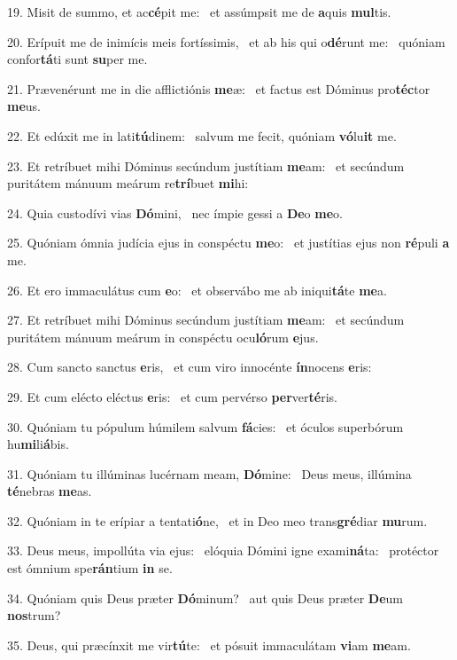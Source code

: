 19. Misit de summo, et ac\textbf{cé}pit me: \ast\  et assúmpsit me de \textbf{a}quis \textbf{mul}tis.\

20. Erípuit me de inimícis meis fortíssimis, \dag\  et ab his qui o\textbf{dé}runt me: \ast\  quóniam confor\textbf{tá}ti sunt \textbf{su}per me.\

21. Prævenérunt me in die afflictiónis \textbf{me}æ: \ast\  et factus est Dóminus pro\textbf{téc}tor \textbf{me}us.\

22. Et edúxit me in lati\textbf{tú}dinem: \ast\  salvum me fecit, quóniam \textbf{vó}lu\textbf{it} me.\

23. Et retríbuet mihi Dóminus secúndum justítiam \textbf{me}am: \ast\  et secúndum puritátem mánuum meárum re\textbf{trí}buet \textbf{mi}hi:\

24. Quia custodívi vias \textbf{Dó}mini, \ast\  nec ímpie gessi a \textbf{De}o \textbf{me}o.\

25. Quóniam ómnia judícia ejus in conspéctu \textbf{me}o: \ast\  et justítias ejus non \textbf{ré}puli \textbf{a} me.\

26. Et ero immaculátus cum \textbf{e}o: \ast\  et observábo me ab iniqui\textbf{tá}te \textbf{me}a.\

27. Et retríbuet mihi Dóminus secúndum justítiam \textbf{me}am: \ast\  et secúndum puritátem mánuum meárum in conspéctu ocu\textbf{ló}rum \textbf{e}jus.\

28. Cum sancto sanctus \textbf{e}ris, \ast\  et cum viro innocénte \textbf{ín}nocens \textbf{e}ris:\

29. Et cum elécto eléctus \textbf{e}ris: \ast\  et cum pervérso \textbf{per}ver\textbf{té}ris.\

30. Quóniam tu pópulum húmilem salvum \textbf{fá}cies: \ast\  et óculos superbórum hu\textbf{mi}li\textbf{á}bis.\

31. Quóniam tu illúminas lucérnam meam, \textbf{Dó}mine: \ast\  Deus meus, illúmina \textbf{té}nebras \textbf{me}as.\

32. Quóniam in te erípiar a tentati\textbf{ó}ne, \ast\  et in Deo meo trans\textbf{gré}diar \textbf{mu}rum.\

33. Deus meus, impollúta via ejus: \dag\  elóquia Dómini igne exami\textbf{ná}ta: \ast\  protéctor est ómnium spe\textbf{rán}tium \textbf{in} se.\

34. Quóniam quis Deus præter \textbf{Dó}minum? \ast\  aut quis Deus præter \textbf{De}um \textbf{nos}trum?\

35. Deus, qui præcínxit me vir\textbf{tú}te: \ast\  et pósuit immaculátam \textbf{vi}am \textbf{me}am.\


